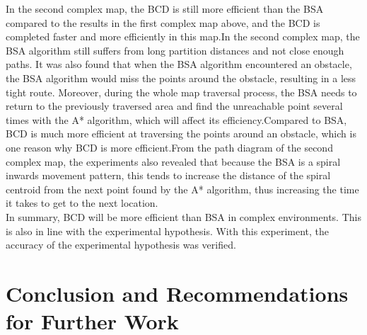 \documentclass[conference]{IEEEtran}
\begin{document}
In the second complex map, the BCD is still more efficient than the BSA compared to the results in the first complex map above, and the BCD is completed faster and more efficiently in this map.In the second complex map, the BSA algorithm still suffers from long partition distances and not close enough paths. It was also found that when the BSA algorithm encountered an obstacle, the BSA algorithm would miss the points around the obstacle, resulting in a less tight route. Moreover, during the whole map traversal process, the BSA needs to return to the previously traversed area and find the unreachable point several times with the A* algorithm, which will affect its efficiency.Compared to BSA, BCD is much more efficient at traversing the points around an obstacle, which is one reason why BCD is more efficient.From the path diagram of the second complex map, the experiments also revealed that because the BSA is a spiral inwards movement pattern, this tends to increase the distance of the spiral centroid from the next point found by the A* algorithm, thus increasing the time it takes to get to the next location.\\
In summary, BCD will be more efficient than BSA in complex environments. This is also in line with the experimental hypothesis. With this experiment, the accuracy of the experimental hypothesis was verified.

\section{Conclusion and Recommendations for Further Work}
\end{document}
